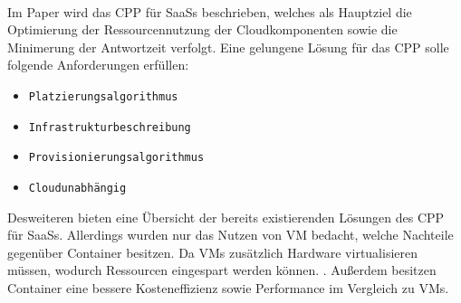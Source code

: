 \paragraph{}
Im Paper \cite{Bousselmi2014} wird das \ac{CPP} für SaaSs beschrieben, welches als Hauptziel die Optimierung der Ressourcennutzung
der Cloudkomponenten sowie die Minimerung der Antwortzeit verfolgt.
Eine gelungene Lösung für das \ac{CPP} solle folgende Anforderungen erfüllen:
\begin{itemize}
  \item \texttt{Platzierungsalgorithmus}
  \item \texttt{Infrastrukturbeschreibung}
  \item \texttt{Provisionierungsalgorithmus}
  \item \texttt{Cloudunabhängig}
\end{itemize}
Desweiteren bieten \citeauthor{Bousselmi2014} eine Übersicht der bereits existierenden Lösungen des \ac{CPP} für \acp{SaaS}.
Allerdings wurden nur das Nutzen von \acf{VM} bedacht, welche Nachteile gegenüber Container besitzen.
Da \acp{VM} zusätzlich Hardware virtualisieren müssen, wodurch Ressourcen eingespart werden können. \cite{seo2014performance}.
Außerdem besitzen Container eine bessere Kosteneffizienz sowie Performance im Vergleich zu \acp{VM}. \cite{soltesz2007container}